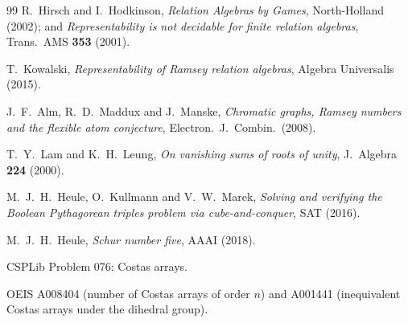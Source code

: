 \documentclass[11pt,a4paper]{article}
\theoremstyle{definition}
\begin{document}
\begin{thebibliography}{99}
 R.~Hirsch and I.~Hodkinson, \emph{Relation Algebras by Games},
North-Holland (2002); and \emph{Representability is not decidable for finite
relation algebras}, Trans.\ AMS \textbf{353} (2001).

 T.~Kowalski, \emph{Representability of Ramsey relation
algebras}, Algebra Universalis (2015).

 J.~F.~Alm, R.~D.~Maddux and J.~Manske, \emph{Chromatic
graphs, Ramsey numbers and the flexible atom conjecture}, Electron.\ J.\
Combin.\ (2008).

 T.~Y.~Lam and K.~H.~Leung, \emph{On vanishing sums of roots
of unity}, J.\ Algebra \textbf{224} (2000).

 M.~J.~H.~Heule, O.~Kullmann and V.~W.~Marek, \emph{Solving and
verifying the Boolean Pythagorean triples problem via cube-and-conquer}, SAT
(2016).

 M.~J.~H.~Heule, \emph{Schur number five}, AAAI (2018).

 CSPLib Problem 076: Costas arrays.

 OEIS A008404 (number of Costas arrays of order $n$) and A001441
(inequivalent Costas arrays under the dihedral group).

\end{thebibliography}
\end{document}
